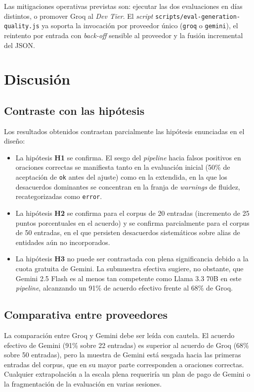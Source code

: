Las mitigaciones operativas previstas son: ejecutar las dos evaluaciones en
días distintos, o promover Groq al \textit{Dev Tier}. El \textit{script}
\texttt{scripts/eval-generation-quality.js} ya soporta la invocación por
proveedor único (\texttt{groq} o \texttt{gemini}), el reintento por entrada con
\textit{back-off} sensible al proveedor y la fusión incremental del JSON.

\section{Discusión}

\subsection{Contraste con las hipótesis}

Los resultados obtenidos contrastan parcialmente las hipótesis enunciadas en el
diseño:

\begin{itemize}
	\item La hipótesis \textbf{H1} se confirma. El sesgo del \textit{pipeline} hacia
	      falsos positivos en oraciones correctas se manifiesta tanto en la evaluación
	      inicial (50\% de aceptación de \texttt{ok} antes del ajuste) como en la
	      extendida, en la que los desacuerdos dominantes se concentran en la franja de
	      \textit{warnings} de fluidez, recategorizadas como \texttt{error}.
	\item La hipótesis \textbf{H2} se confirma para el corpus de 20 entradas (incremento
	      de 25 puntos porcentuales en el acuerdo) y se confirma parcialmente para el
	      corpus de 50 entradas, en el que persisten desacuerdos sistemáticos sobre alias
	      de entidades aún no incorporados.
	\item La hipótesis \textbf{H3} no puede ser contrastada con plena significancia
	      debido a la cuota gratuita de Gemini. La submuestra efectiva sugiere, no
	      obstante, que Gemini 2.5 Flash es al menos tan competente como Llama 3.3 70B en
	      este \textit{pipeline}, alcanzando un 91\% de acuerdo efectivo frente al 68\%
	      de Groq.
\end{itemize}

\subsection{Comparativa entre proveedores}

La comparación entre Groq y Gemini debe ser leída con cautela. El acuerdo
efectivo de Gemini (91\% sobre 22 entradas) es superior al acuerdo de Groq
(68\% sobre 50 entradas), pero la muestra de Gemini está sesgada hacia las
primeras entradas del corpus, que en su mayor parte corresponden a oraciones
correctas. Cualquier extrapolación a la escala plena requeriría un plan de pago
de Gemini o la fragmentación de la evaluación en varias sesiones.

